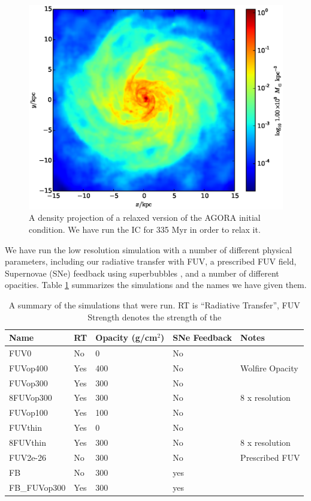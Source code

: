 \begin{figure}
\includegraphics[width=\textwidth]{graphics/AGORAic.eps}
\caption[The AGORA IC]{A density projection of a relaxed version of the AGORA initial condition. We have run the IC for 335 Myr in order to relax it.}
\label{fig:agoraic}
\end{figure}


We have run the low resolution simulation with a number of different physical parameters, including our radiative transfer with FUV, a prescribed FUV field, Supernovae (SNe) feedback using superbubbles \citep{kellerEt14}, and a number of different opacities. Table \ref{tab:simsummary} summarizes the simulations and the names we have given them.

\begin{table}
\begin{tabular}{llllp{3cm}}
Name & RT & Opacity (g/cm$^{2}$) & SNe Feedback & Notes\\ \hline \hline
FUV0 & No & 0 & No &\\
FUVop400 & Yes & 400 & No & Wolfire Opacity\\
FUVop300 & Yes & 300 & No & \\
8FUVop300 & Yes & 300 & No & 8 x resolution\\
FUVop100 & Yes & 100 & No & \\
FUVthin & Yes & 0 & No & \\
8FUVthin & Yes & 300 & No & 8 x resolution\\
FUV2e-26 & No & 300 & No & Prescribed FUV\\
FB & No & 300 & yes & \\
FB\_FUVop300 & Yes & 300 & yes & \\
\hline
\end{tabular}
\caption[Summary of simulations]{A summary of the simulations that were run. RT is ``Radiative Transfer'', FUV Strength denotes the strength of the }
\label{tab:simsummary}
\end{table}

